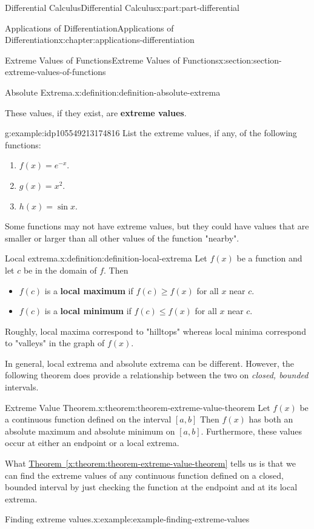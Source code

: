 \documentclass[twoside,10pt,]{book}
\newcommand{\xreffont}{\relax}
\newcommand{\terminology}[1]{\textbf{#1}}
\numberwithin{equation}{part}
\begin{document}
\begin{partptx}{Differential Calculus}{}{Differential Calculus}{}{}{x:part:part-differential}
\begin{chapterptx}{Applications of Differentiation}{}{Applications of Differentiation}{}{}{x:chapter:applications-differentiation}
\begin{sectionptx}{Extreme Values of Functions}{}{Extreme Values of Functions}{}{}{x:section:section-extreme-values-of-functions}
\begin{definition}{Absolute Extrema.}{x:definition:definition-absolute-extrema}
\begin{itemize}[label=\textbullet]
\end{itemize}
These values, if they exist, are \terminology{extreme values}.%
\end{definition}
\begin{example}{}{g:example:idp105549213174816}%
List the extreme values, if any, of the following functions:%
\begin{enumerate}
\item{}\(f(x) = e^{-x}\).%
\item{}\(g(x) = x^{2}\).%
\item{}\(h(x) = \sin x\).%
\end{enumerate}
%
\end{example}
Some functions may not have extreme values, but they could have values that are smaller or larger than all other values of the function "nearby".%
\begin{definition}{Local extrema.}{x:definition:definition-local-extrema}%
%
Let \(f(x)\) be a function and let \(c\) be in the domain of \(f\). Then%
\begin{itemize}[label=\textbullet]
\item{}\(f(c)\) is a \terminology{local maximum} if \(f(c)\geq f(x)\) for all \(x\) near \(c\).%
\item{}\(f(c)\) is a \terminology{local minimum} if \(f(c)\leq f(x)\) for all \(x\) near \(c\).%
\end{itemize}
Roughly, local maxima correspond to "hilltops" whereas local minima correspond to "valleys" in the graph of \(f(x)\).%
\end{definition}
In general, local extrema and absolute extrema can be different. However, the following theorem does provide a relationship between the two on \emph{closed, bounded} intervals.%
\begin{theorem}{Extreme Value Theorem.}{}{x:theorem:theorem-extreme-value-theorem}%
%
Let \(f(x)\) be a continuous function defined on the interval \([a,b]\) Then \(f(x)\) has both an absolute maximum and absolute minimum on \([a,b]\). Furthermore, these values occur at either an endpoint or a local extrema.%
\end{theorem}
What \hyperref[x:theorem:theorem-extreme-value-theorem]{Theorem~{\xreffont\ref{x:theorem:theorem-extreme-value-theorem}}} tells us is that we can find the extreme values of any continuous function defined on a closed, bounded interval by just checking the function at the endpoint and at its local extrema.%
\begin{example}{Finding extreme values.}{x:example:example-finding-extreme-values}%

\end{example}
\end{sectionptx}
\end{chapterptx}
\end{partptx}
\end{document}
